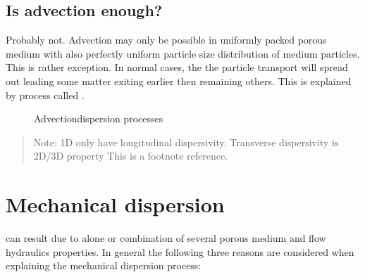 \documentclass[letterpaper,10pt,english]{jupyterBook}
\begin{document}
\subsection{Is advection enough?}
\label{\detokenize{content/transport/L9/21_conservative_transport:is-advection-enough}}
\sphinxAtStartPar
Probably not. Advection may only be possible in uniformly packed porous medium with also perfectly uniform particle size distribution of medium particles. This is rather exception. In normal cases, the the particle transport will spread out leading some matter exiting earlier then remaining others. This is explained by process called .

\begin{figure}[htbp]
\centering
\capstart

\noindent{}
\caption{Advection\sphinxhyphen{}dispersion processes}\label{\detokenize{content/transport/L9/21_conservative_transport:ad-dis}}\end{figure}
\begin{quote}

\sphinxAtStartPar
Note: 1D only have longitudinal dispersivity. Transverse dispersivity is 2D/3D property
This is a footnote reference.
\end{quote}


\section{Mechanical dispersion}
\label{\detokenize{content/transport/L9/21_conservative_transport:mechanical-dispersion}}
\sphinxAtStartPar
{} can result due to alone or combination of several porous medium and flow hydraulics properties. In general the following three reasons are considered when explaining the mechanical dispersion process:
\end{document}
